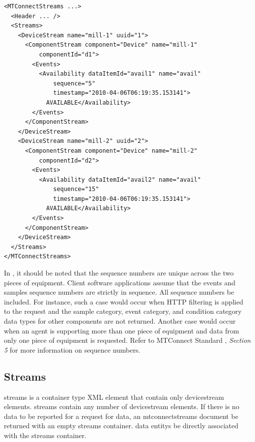 \begin{lstlisting}[firstnumber=1,escapechar=|,%
    caption={Example of  DeviceStream},label={lst:example-of-devicestream}]
<MTConnectStreams ...>
  <Header ... />
  <Streams>
    <DeviceStream name="mill-1" uuid="1">
      <ComponentStream component="Device" name="mill-1"
          componentId="d1">
        <Events>
          <Availability dataItemId="avail1" name="avail"
              sequence="5"
              timestamp="2010-04-06T06:19:35.153141">
            AVAILABLE</Availability>
        </Events>
      </ComponentStream>
    </DeviceStream>
    <DeviceStream name="mill-2" uuid="2">
      <ComponentStream component="Device" name="mill-2"
          componentId="d2">
        <Events>
          <Availability dataItemId="avail2" name="avail" 
              sequence="15"
              timestamp="2010-04-06T06:19:35.153141">
            AVAILABLE</Availability>
        </Events>
      </ComponentStream>
    </DeviceStream>
  </Streams>
</MTConnectStreams>
\end{lstlisting}

In , it should be noted that the \glspl{sequence number} are unique across the two pieces of equipment. Client software applications \MUSTNOT assume that the \gls{events} and \gls{samples} sequence numbers are strictly in sequence. All sequence numbers \MAYNOT be included. For instance, such a case would occur when HTTP filtering is applied to the request and the \gls{sample category}, \gls{event category}, and \gls{condition category} data types for other components are not returned. Another case would occur when an \gls{agent} is supporting more than one piece of equipment and data from only one piece of equipment is requested. Refer to MTConnect Standard , \textit{Section 5} for more information on \glspl{sequence number}.


\subsection{Streams}

\gls{streams} is a container type XML element that \must contain only \gls{devicestream} elements.  \gls{streams} \may contain any number of \gls{devicestream} elements.  If there is no data to be reported for a request for data, an \gls{mtconnectstreams} document \must be returned with an empty \gls{streams} container.  \glspl{data entity} \maynot be directly associated with the \gls{streams} container.

